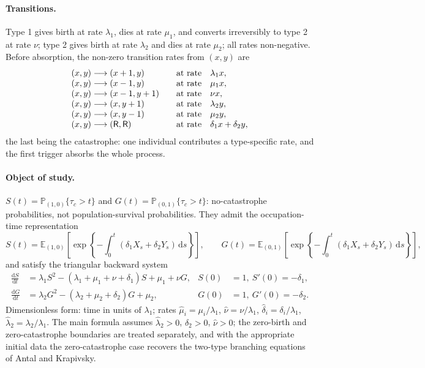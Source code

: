 \documentclass[11pt,a4paper]{report}
\newcommand{\E}{\mathbb{E}}
\newcommand{\Prob}{\mathbb{P}}
\newcommand{\dd}{\mathrm{d}}
\newcommand{\R}{\mathsf{R}}
\theoremstyle{definition}
\begin{document}
\paragraph{Transitions.} Type 1 gives birth at rate $\lambda_1$, dies at
rate $\mu_1$, and converts irreversibly to type 2 at rate $\nu$; type 2
gives birth at rate $\lambda_2$ and dies at rate $\mu_2$; all rates
non-negative. Before absorption, the non-zero transition rates from
$(x,y)$ are
\begin{equation}
\begin{array}{@{}r@{\;}l@{\qquad}l@{}}
(x,y)&\longrightarrow(x+1,y)&\text{at rate}\quad\lambda_1x,\\
(x,y)&\longrightarrow(x-1,y)&\text{at rate}\quad\mu_1x,\\
(x,y)&\longrightarrow(x-1,y+1)&\text{at rate}\quad\nu x,\\
(x,y)&\longrightarrow(x,y+1)&\text{at rate}\quad\lambda_2y,\\
(x,y)&\longrightarrow(x,y-1)&\text{at rate}\quad\mu_2y,\\
(x,y)&\longrightarrow(\R,\R)&\text{at rate}\quad\delta_1x+\delta_2y,
\end{array}
\end{equation}
the last being the catastrophe: one individual contributes a
type-specific rate, and the first trigger absorbs the whole process.

\paragraph{Object of study.}
$S(t)=\Prob_{(1,0)}\{\tau_c>t\}$ and
$G(t)=\Prob_{(0,1)}\{\tau_c>t\}$: no-catastrophe probabilities, not
population-survival probabilities. They admit the occupation-time
representation
\begin{equation}
S(t)=\E_{(1,0)}\!\left[
\exp\!\left\{-\int_0^t(\delta_1X_s+\delta_2Y_s)\,\dd s\right\}\right],
\qquad
G(t)=\E_{(0,1)}\!\left[
\exp\!\left\{-\int_0^t(\delta_1X_s+\delta_2Y_s)\,\dd s\right\}\right],
\end{equation}
and satisfy the triangular backward system
\begin{align}
\frac{\dd S}{\dd t}
&=\lambda_1S^2-(\lambda_1+\mu_1+\nu+\delta_1)S+\mu_1+\nu G,
&S(0)&=1,\ S'(0)=-\delta_1,\\
\frac{\dd G}{\dd t}
&=\lambda_2G^2-(\lambda_2+\mu_2+\delta_2)G+\mu_2,
&G(0)&=1,\ G'(0)=-\delta_2.
\end{align}
Dimensionless form: time in units of $\lambda_1$; rates
$\hat\mu_i=\mu_i/\lambda_1$, $\hat\nu=\nu/\lambda_1$,
$\hat\delta_i=\delta_i/\lambda_1$, $\hat\lambda_2=\lambda_2/\lambda_1$.
The main formula assumes $\hat\lambda_2>0$, $\hat\delta_2>0$,
$\hat\nu>0$; the zero-birth and zero-catastrophe boundaries are treated
separately, and with the appropriate initial data the zero-catastrophe case
recovers the two-type branching equations of Antal and Krapivsky.
\end{document}
